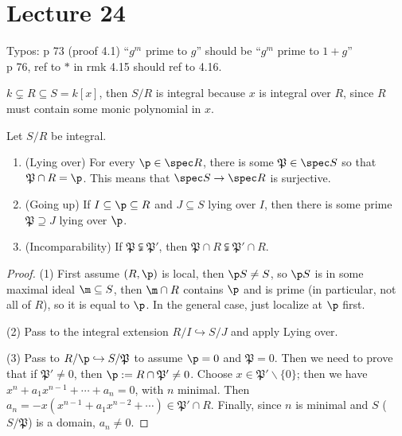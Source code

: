  \section{Lecture 24}

 Typos: p 73 (proof 4.1) ``$g^m$ prime to $g$'' should be ``$g^m$ prime to $1+g$''\\
 p 76, ref to $\ast$ in rmk 4.15 should ref to 4.16.

 \begin{example}
   $k\subsetneq R\subseteq S=k[x]$, then $S/R$ is integral because $x$ is integral over
   $R$, since $R$ must contain some monic polynomial in $x$.
 \end{example}
 \begin{theorem}[Going Up]
   Let $S/R$ be integral.
   \begin{enumerate}
     \item (Lying over) For every $\p\in \spec R$, there is some $\mathfrak{P}\in \spec
     S$ so that $\mathfrak{P}\cap R=\p$. This means that $\spec S\to \spec R$ is
     surjective.

     \item (Going up) If $I\subseteq \p\subseteq R$ and $J\subseteq S$ lying over $I$,
     then there is some prime $\mathfrak{P}\supseteq J$ lying over $\p$.

     \item (Incomparability) If $\mathfrak{P}\subsetneqq \mathfrak{P}'$, then $\mathfrak{P}\cap R\subsetneqq
     \mathfrak{P}'\cap R$.
   \end{enumerate}
 \end{theorem}
 \begin{proof}
   (1) First assume $(R,\p)$ is local, then $\p S\neq S$, so $\p S$ is in some maximal
   ideal $\m\subseteq S$, then $\m\cap R$ contains $\p$ and is prime (in particular, not
   all of $R$), so it is equal to $\p$. In the general case, just localize at $\p$ first.

   (2) Pass to the integral extension $R/I\hookrightarrow S/J$ and apply Lying over.

   (3) Pass to $R/\p\hookrightarrow S/\mathfrak{P}$ to assume $\p=0$ and $\mathfrak{P}=0$.
   Then we need to prove that if $\mathfrak{P}'\neq 0$, then $\p:=R\cap \mathfrak{P}'\neq
   0$. Choose $x\in \mathfrak{P}'\smallsetminus \{0\}$; then we have
   $x^n+a_1x^{n-1}+\cdots + a_n=0$, with $n$ minimal. Then
   $a_n=-x(x^{n-1}+a_1x^{n-2}+\cdots )\in \mathfrak{P}'\cap R$. Finally, since $n$ is
   minimal and $S$ ($S/\mathfrak{P}$) is a domain, $a_n\neq 0$.
 \end{proof}
